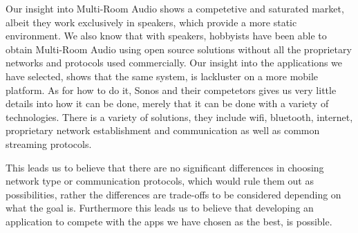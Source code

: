 \bigskip
Our insight into Multi-Room Audio shows a competetive and saturated market, albeit they work exclusively in speakers, which provide a more static environment.
We also know that with speakers, hobbyists have been able to obtain Multi-Room Audio using open source solutions without all the proprietary networks and protocols used commercially.
Our insight into the applications we have selected, shows that the same system, is lackluster on a more mobile platform.
As for how to do it, Sonos and their competetors gives us very little details into how it can be done, merely that it can be done with a variety of technologies.
There is a variety of solutions, they include wifi, bluetooth, internet, proprietary network establishment and communication as well as common streaming protocols.

This leads us to believe that there are no significant differences in choosing network type or communication protocols, which would rule them out as possibilities, rather the differences are trade-offs to be considered depending on what the goal is.
Furthermore this leads us to believe that developing an application to compete with the apps we have chosen as the best, is possible.
